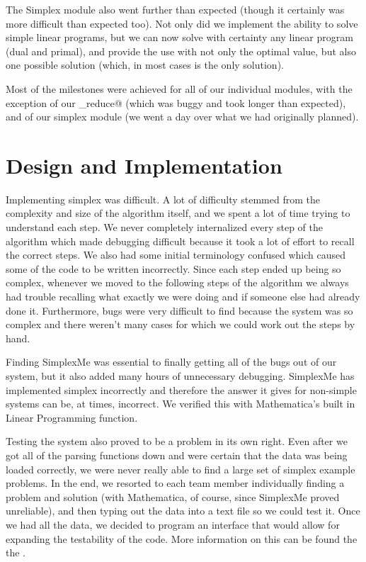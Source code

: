 \documentclass[letterpaper,11pt]{article}
\begin{document}
The Simplex module also went further than expected (though it certainly was more
difficult  than expected too). Not only did we implement the ability to solve
simple linear programs, but we can now solve with certainty any linear program
(dual and primal), and provide the use with not only the optimal value, but also
one possible solution (which, in most cases is the only solution). 

Most of the milestones were achieved for all of our individual modules, with the
exception of our \verb@row_reduce@ (which was buggy and took longer than
expected), and of our simplex module (we went a day over what we had originally
planned). 

\section{Design and Implementation}

Implementing simplex was difficult. A lot of difficulty stemmed from the
complexity and size of the algorithm itself, and we spent a lot of time trying
to understand each step. We never completely internalized every step of the
algorithm which made debugging difficult because it took a lot of effort to
recall the correct steps. We also had some initial terminology confused which
caused some of the code to be written incorrectly. Since each step ended up
being so complex, whenever we moved to the following steps of the algorithm we
always had trouble recalling what exactly we were doing and if someone else had
already done it. Furthermore, bugs were very difficult to find because the
system was so complex and there weren't many cases for which we could work
out the steps by hand. 

Finding SimplexMe was essential to finally getting all of the bugs out of our
system, but it also added many hours of unnecessary debugging. SimplexMe has
implemented simplex incorrectly and therefore the answer it gives for non-simple
systems can be, at times, incorrect. We verified this with Mathematica's
built in Linear Programming function.

Testing the system also proved to be a problem in its own right. Even after we
got all of the parsing functions down and were certain that the data was being
loaded correctly, we were never really able to find a large set of simplex
example problems. In the end, we resorted to each team member individually
finding a problem and solution (with Mathematica, of course, since SimplexMe
proved unreliable), and then typing out the data into a text file so we could
test it. Once we had all the data, we decided to program an interface that would
allow for expanding the testability of the code. More information on this can be
found the the \verb@README@.
\end{document}
